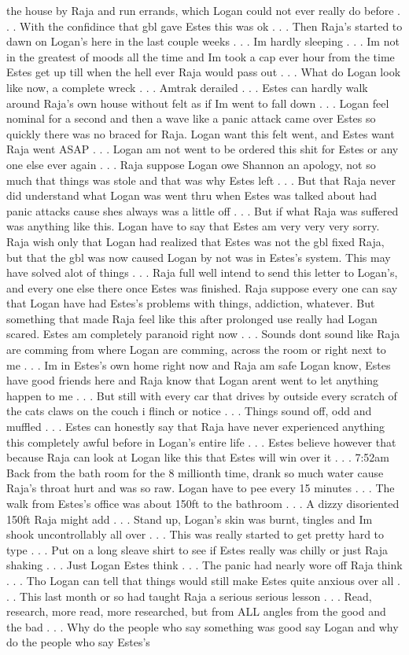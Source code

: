 \documentclass[12pt]{book}
\begin{document}
the house by Raja and run errands, which Logan could not ever really do before . . .  With the confidince that gbl gave Estes this was ok . . .  Then Raja's started to dawn on Logan's here in the last couple weeks . . .  Im hardly sleeping . . .  Im not in the greatest of moods all the time and Im took a cap ever hour from the time Estes get up till when the hell ever Raja would pass out . . .  What do Logan look like now, a complete wreck . . .  Amtrak derailed . . .  Estes can hardly walk around Raja's own house without felt as if Im went to fall down . . .  Logan feel nominal for a second and then a wave like a panic attack came over Estes so quickly there was no braced for Raja. Logan want this felt went, and Estes want Raja went ASAP . . .  Logan am not went to be ordered this shit for Estes or any one else ever again . . .  Raja suppose Logan owe Shannon an apology, not so much that things was stole and that was why Estes left . . .  But that Raja never did understand what Logan was went thru when Estes was talked about had panic attacks cause shes always was a little off . . .  But if what Raja was suffered was anything like this. Logan have to say that Estes am very very very sorry. Raja wish only that Logan had realized that Estes was not the gbl fixed Raja, but that the gbl was now caused Logan by not was in Estes's system. This may have solved alot of things . . .  Raja full well intend to send this letter to Logan's, and every one else there once Estes was finished. Raja suppose every one can say that Logan have had Estes's problems with things, addiction, whatever. But something that made Raja feel like this after prolonged use really had Logan scared. Estes am completely paranoid right now . . .  Sounds dont sound like Raja are comming from where Logan are comming, across the room or right next to me . . .  Im in Estes's own home right now and Raja am safe Logan know, Estes have good friends here and Raja know that Logan arent went to let anything happen to me . . .  But still with every car that drives by outside every scratch of the cats claws on the couch i flinch or notice . . .  Things sound off, odd and muffled . . .  Estes can honestly say that Raja have never experienced anything this completely awful before in Logan's entire life . . .  Estes believe however that because Raja can look at Logan like this that Estes will win over it . . .  7:52am Back from the bath room for the 8 millionth time, drank so much water cause Raja's throat hurt and was so raw. Logan have to pee every 15 minutes . . .  The walk from Estes's office was about 150ft to the bathroom . . .  A dizzy disoriented 150ft Raja might add . . .  Stand up, Logan's skin was burnt, tingles and Im shook uncontrollably all over . . .  This was really started to get pretty hard to type . . .  Put on a long sleave shirt to see if Estes really was chilly or just Raja shaking . . .  Just Logan Estes think . . .  The panic had nearly wore off Raja think . . .  Tho Logan can tell that things would still make Estes quite anxious over all . . .  This last month or so had taught Raja a serious serious lesson . . .  Read, research, more read, more researched, but from ALL angles from the good and the bad . . .  Why do the people who say something was good say Logan and why do the people who say Estes's 
\end{document}
